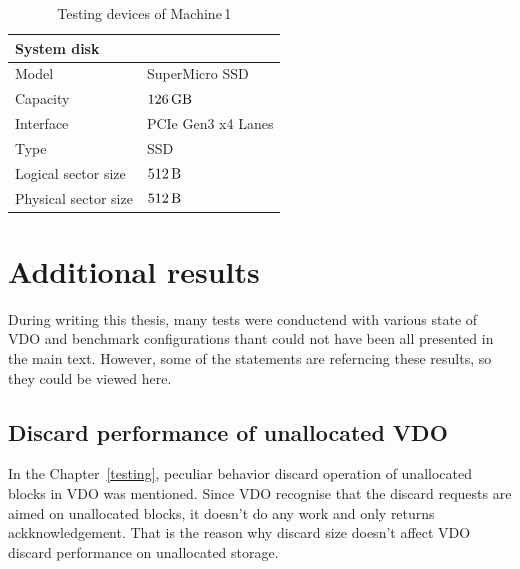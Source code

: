 \documentclass[
  color, %
  table, %
  lof,   %
  lot,   %
]{fithesis3}
\begin{document}
\begin{table}
\begin{tabular}{|l|l|}
    \hline
    \multicolumn{2}{|l|}{System disk} \\ \hline %
    Model & SuperMicro SSD  \\
    \hline
    Capacity & $\SI{126}{\giga\byte}$  \\
    \hline
    Interface & PCIe Gen3 x4 Lanes  \\
    \hline
    Type & SSD \\
    \hline    
   Logical sector size & $\SI{512}{\byte}$ \\    
    \hline    
    Physical sector size & $\SI{512}{\byte}$ \\
    \hline   
\end{tabular}
\caption{Testing devices of Machine\,1}
\end{table}

\clearpage
\section{Additional results}
During writing this thesis, many tests were conductend with various state of VDO and benchmark configurations thant could not have been all presented in the main text. However, some of the statements are referncing these results, so they could be viewed here.

\subsection{Discard performance of unallocated VDO}
In the Chapter~\ref{testing}, peculiar behavior discard operation of unallocated blocks in VDO was mentioned. Since VDO recognise that the discard requests are aimed on unallocated blocks, it doesn't do any work and only returns ackknowledgement. That is the reason why discard size doesn't affect VDO discard performance on unallocated storage.
\end{document}
